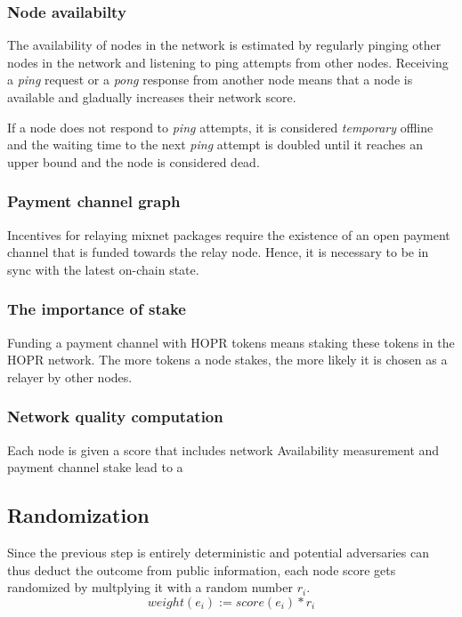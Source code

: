 \subsubsection{Node availabilty}

The availability of nodes in the network is estimated by regularly pinging other nodes in the network and listening to ping attempts from other nodes. Receiving a \textit{ping} request or a \textit{pong} response from another node means that a node is available and gladually increases their network score.

If a node does not respond to \textit{ping} attempts, it is considered \textit{temporary} offline and the waiting time to the next \textit{ping} attempt is doubled until it reaches an upper bound and the node is considered dead.

\subsubsection{Payment channel graph}

Incentives for relaying mixnet packages require the existence of an open payment channel that is funded towards the relay node. Hence, it is necessary to be in sync with the latest on-chain state.

\subsubsection{The importance of stake}

Funding a payment channel with HOPR tokens means staking these tokens in the HOPR network. The more tokens a node stakes, the more likely it is chosen as a relayer by other nodes.

\subsubsection{Network quality computation}

Each node is given a score that includes network
Availability measurement and payment channel stake lead to a

\subsection{Randomization}
\label{sec:path-selection:randomization}

Since the previous step is entirely deterministic and potential adversaries can thus deduct the outcome from public information, each node score gets randomized by multplying it with a random number $r_i$.
$$weight(e_i) := score(e_i) * r_i$$

